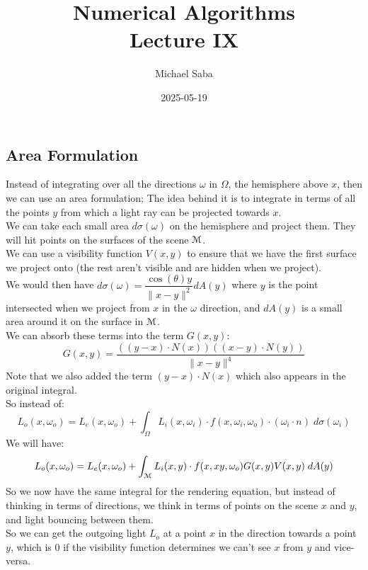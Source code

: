 \documentclass[12pt]{article}
\title{%
    \Huge Numerical Algorithms \\
    \Large Lecture IX
}
\date{2025-05-19}
\author{Michael Saba}
\begin{document}
\maketitle
\newpage
\setlength{\parindent}{0pt}

\subsection*{Area Formulation}

Instead of integrating over all the directions
$\omega$ in $\Omega$, the hemisphere
above $x$,
then we can use an area formulation;
The idea behind it is to integrate
in terms of all the points $y$
from which a light ray can be projected
towards $x$. \\

We can take each small area $d\sigma(\omega)$
on the hemisphere and project them.
They will hit points on the surfaces
of the scene $\mathcal{M}$. \\

We can use a visibility function $V(x, y)$
to ensure that we have the first surface we project
onto (the rest aren't visible and are hidden
when we project). \\

We would then have $d\sigma(\omega)
= \dfrac{\cos(\theta)y}{\|x-y\|^2}dA(y)$
where $y$ is the point intersected
when we project from $x$ in the $\omega$
direction, and $dA(y)$ is a small area around it
on the surface in $\mathcal{M}$. \\

We can absorb these terms into the
term $G(x, y)$:
\[ G(x, y) = \dfrac{((y-x)\cdot N(x))((x-y)\cdot N(y))}
{\|x-y\|^4} \]
Note that we also added the term $(y-x)\cdot N(x)$
which also appears in the original integral. \\

So instead of:
\[  L_{o}(x, \omega_o)= L_{e}(x, \omega_o) +
\int_\Omega L_{i}(x, \omega_i) \cdot
f(x, \omega_i, \omega_o) \cdot
(\omega_i \cdot n) \; d\sigma(\omega_i) \]
We will have:
\[  L_{o}(x, \omega_o)= L_{e}(x, \omega_o) +
\int_{\mathcal{M}} L_{i}(x, y) \cdot
f(x, xy, \omega_o) G(x, y) V(x, y) \; dA(y) \]
So we now have the same integral
for the rendering equation, but instead
of thinking in terms of directions, we think
in terms of points on the scene $x$ and $y$,
and light bouncing between them. \\
So we can get the outgoing light $L_o$
at a point $x$ in the direction towards a point $y$,
which is $0$ if the visibility function
determines we can't see $x$ from $y$ and vice-versa. \\
\end{document}

